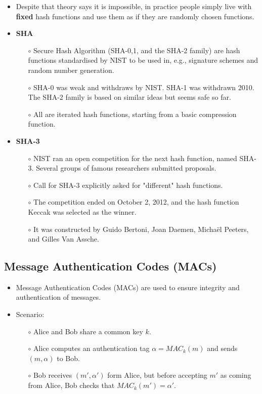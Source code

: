 \documentclass[a4paper]{scrartcl}
\begin{document}
\begin{itemize}
\item Despite that theory says it is impossible, in practice people simply live with \textbf{fixed} hash functions and use them as if they are randomly chosen functions. 
\item \textbf{SHA}
\begin{itemize}
\item [$\circ$] Secure Hash Algorithm (SHA-0,1, and the SHA-2 family) are hash functions standardised by NIST to be used in, e.g., signature schemes and random number generation. 
\item [$\circ$] SHA-0 was weak and withdraws by NIST. SHA-1 was withdrawn 2010. The SHA-2 family is based on similar ideas but seems safe so far.
\item [$\circ$] All are iterated hash functions, starting from a basic compression function.
\end{itemize}
\item \textbf{SHA-3}
\begin{itemize}
\item [$\circ$] NIST ran an open competition for the next hash function, named SHA-3. Several groups of famous researchers submitted proposals. 
\item [$\circ$] Call for SHA-3 explicitly asked for "different" hash functions. 
\item [$\circ$] The competition ended on October 2, 2012, and the hash function Keccak was selected as the winner.
\item [$\circ$] It was constructed by Guido Bertoni, Joan Daemen, Micha\"el Peeters, and Gilles Van Assche.
\end{itemize}
\end{itemize}

\subsection*{Message Authentication Codes (MACs)}

\begin{itemize}
\item Message Authentication Codes (MACs) are used to ensure integrity and authentication of messages.
\item Scenario:
\begin{itemize}
\item [$\circ$] Alice and Bob share a common key $k$.
\item [$\circ$] Alice computes an authentication tag $\alpha = MAC_k(m)$ and sends $(m,\alpha)$ to Bob.
\item [$\circ$] Bob receives $(m',\alpha')$ form Alice, but before accepting $m'$ as coming from Alice, Bob checks that $MAC_k(m')=\alpha'$.
\end{itemize}
\end{itemize}
\end{document}
